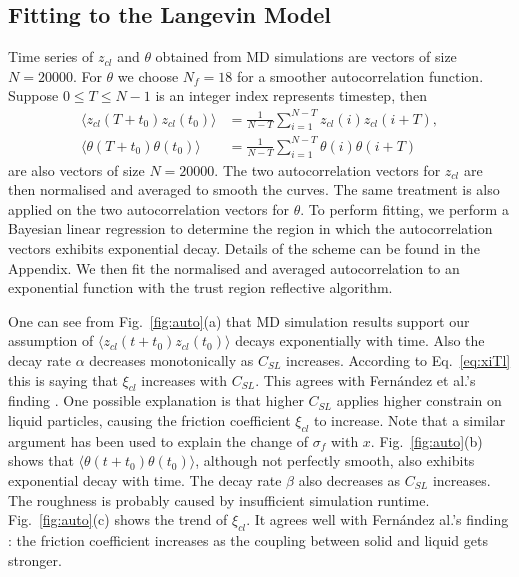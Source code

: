 \documentclass[
reprint,
 amsmath,amssymb,
 aps,
url
]{revtex4-1}
\begin{document}
\subsection{Fitting to the Langevin Model}


Time series of $z_{cl}$ and $\theta$ obtained from MD simulations are vectors of size $N=20000$. For $\theta$ we choose $N_f=18$ for a smoother autocorrelation function. Suppose $0\leq T\leq N-1$ is an integer index represents timestep, then
\begin{align}
	\langle z_{cl}(T+t_0)z_{cl}(t_0)\rangle &= \frac{1}{N-T}\sum_{i=1}^{N-T}z_{cl}(i)z_{cl}(i+T),\\
	\langle \theta(T+t_0)\theta(t_0)\rangle &= \frac{1}{N-T}\sum_{i=1}^{N-T}\theta(i)\theta(i+T)
\end{align}  
are also vectors of size $N=20000$. The two autocorrelation vectors for $z_{cl}$ are then normalised and averaged to smooth the curves. The same treatment is also applied on the two autocorrelation vectors for $\theta$. To perform fitting, we perform a Bayesian linear regression to determine the region in which the autocorrelation vectors exhibits exponential decay. Details of the scheme can be found in the Appendix. We then fit the normalised and averaged autocorrelation to an exponential function with the trust region reflective algorithm.

One can see from Fig.~\ref{fig:auto}(a) that MD simulation results support our assumption of $\langle z_{cl}(t+t_0)z_{cl}(t_0)\rangle$ decays exponentially with time. Also the decay rate $\alpha$ decreases monotonically as $C_{SL}$ increases. According to Eq.~\ref{eq:xiTl} this is saying that $\xi_{cl}$ increases with $C_{SL}$. This agrees with Fern\'andez et al.'s finding \cite{fernandez-toledano_contact-line_2019}. One possible explanation is that higher $C_{SL}$ applies higher constrain on liquid particles, causing the friction coefficient $\xi_{cl}$ to increase. Note that a similar argument has been used to explain the change of $\sigma_f$ with $x$. Fig.~\ref{fig:auto}(b) shows that $\langle \theta(t+t_0)\theta(t_0)\rangle$, although not perfectly smooth, also exhibits exponential decay with time. The decay rate $\beta$ also decreases as $C_{SL}$ increases. The roughness is probably caused by insufficient simulation runtime. Fig.~\ref{fig:auto}(c) shows the trend of $\xi_{cl}$. It agrees well with Fern\'andez al.'s finding \cite{fernandez-toledano_contact-line_2019}: the friction coefficient increases as the coupling between solid and liquid gets stronger. 
\end{document}

